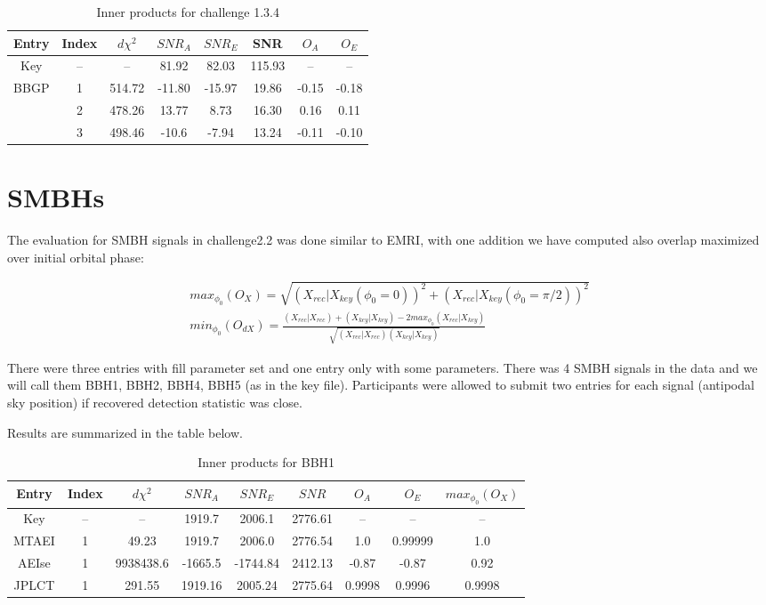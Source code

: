 \documentclass[prd,aps,amsfonts,amsmath, nofootinbib]{revtex4}
\def\bea{\begin{eqnarray}}
\def\ena{\end{eqnarray}}
\begin{document}
\begin{table}
\caption{\label{OlapsTable1.3.4} Inner products for challenge 1.3.4}
\begin{ruledtabular}
\begin{tabular}{|c|c|c|c|c|c|c|c|}
Entry & Index & $d\chi^2$ & $SNR_A$ & $SNR_E$ & SNR & $O_A$ & $O_E$\\
\hline
Key  & -- & -- &  81.92 & 82.03 & 115.93 & -- & -- \\
\hline
BBGP & 1  & 514.72 & -11.80 & -15.97 & 19.86 & -0.15 & -0.18 \\
     & 2  &  478.26  & 13.77 & 8.73 & 16.30 & 0.16 & 0.11 \\
     & 3  & 498.46  & -10.6 & -7.94 & 13.24 & -0.11 &  -0.10 \\
\hline
\end{tabular}
\end{ruledtabular}
\end{table}


\section{SMBHs}

The evaluation for SMBH signals in challenge2.2 was done similar to EMRI,
with one addition we have computed also overlap maximized over initial 
orbital phase:

\bea
max_{\phi_0}(O_X) = \sqrt{(X_{rec}|X_{key}(\phi_0 = 0))^2 +
(X_{rec}|X_{key}(\phi_0 = \pi/2))^2}\\
min_{\phi_0}(O_{dX}) = \frac{ (X_{rec}|X_{rec}) + (X_{key}|X_{key}) -
2 max_{\phi_0}(X_{rec}|X_{key})}{\sqrt{(X_{rec}|X_{rec})(X_{key}|X_{key})}}
\ena

There were three entries with fill parameter set and one entry only with 
some parameters.
There was 4 SMBH signals in the data and we will call them BBH1, BBH2, BBH4, BBH5
(as in the key file). Participants were allowed to submit two entries for
each signal (antipodal sky position) if recovered detection statistic was close.

Results are summarized in the table below.

\begin{table}
\caption{\label{BBH1} Inner products for BBH1}
\begin{ruledtabular}
\begin{tabular}{|c|c|c|c|c|c|c|c|c|}
Entry & Index & $d\chi^2$ & $SNR_A$ & $SNR_E$ & $SNR$ & $O_A$ & $O_E$ & $max_{\phi_0}(O_X)$\\
\hline
Key & -- & -- & 1919.7 & 2006.1 & 2776.61 & -- & -- & -- \\
\hline
MTAEI & 1 & 49.23 & 1919.7 & 2006.0 & 2776.54 & 1.0 & 0.99999 & 1.0   \\
\hline
AEIse & 1 & 9938438.6 & -1665.5  & -1744.84 & 2412.13 & -0.87 & -0.87 &  0.92  \\
\hline
JPLCT & 1 &  291.55  & 1919.16 & 2005.24 & 2775.64 & 0.9998   &  0.9996  & 0.9998 \\
\hline
\end{tabular}
\end{ruledtabular}
\end{table}
\end{document}
